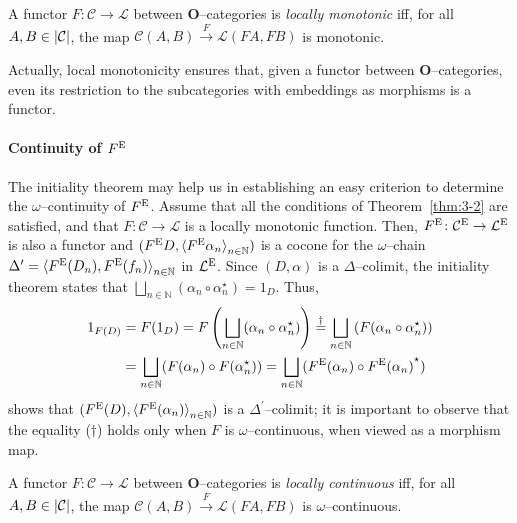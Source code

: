 \begin{dfn}
  A functor \(F \colon \mathcal{C} \to \mathcal{L}\) between \(\mathbf{O}\)--categories is \emph{locally monotonic} iff, for all \(A, B \in \lvert \mathcal{C} \rvert\), the map \(\mathcal{C}(A,B) \overset{F}{\to}\mathcal{L}(FA,FB)\) is monotonic.
\end{dfn}

Actually, local monotonicity ensures that, given a functor between \(\mathbf{O}\)--categories, even its restriction to the subcategories with embeddings as morphisms is a functor.

\paragraph{Continuity of \(F^\textup{E}\)}
The initiality theorem may help us in establishing an easy criterion to determine the \(\omega\)--continuity of \(F^\textup{E}\). %
Assume that all the conditions of Theorem~\ref{thm:3-2} are satisfied, and that \(F \colon \mathcal{C} \to \mathcal{L}\) is a locally monotonic function.
Then, \(F^\textup{E} \colon \mathcal{C}^\textup{E} \to \mathcal{L}^\textup{E}\) is also a functor and \((F^\textup{E}D, {\langle F^\textup{E}\alpha_n\rangle}_{n \in \mathbb{N}})\) is a cocone for the \(\omega\)--chain %
\(\Delta^\prime = {\langle F^\textup{E}(D_n), F^\textup{E}(f_n)\rangle}_{n \in \mathbb{N}}\) in \(\mathcal{L}^\textup{E}\).
Since \((D,\alpha)\) is a \(\Delta\)--colimit, the initiality theorem states that \(\bigsqcup_{n \in \mathbb{N}}(\alpha_n \circ \alpha_n^\star) = 1_D\). %
Thus,
\begin{equation*}
  \begin{split}
    1_{F(D)} &= F(1_D) = F\left(\bigsqcup_{n \in \mathbb{N}}(\alpha_n \circ \alpha_n^\star)\right) \overset{\dagger}{=} \bigsqcup_{n \in \mathbb{N}}\left(F(\alpha_n \circ \alpha_n^\star)\right) \\ &= \bigsqcup_{n \in \mathbb{N}}(F(\alpha_n) \circ F(\alpha_n^\star))
    = \bigsqcup_{n \in \mathbb{N}}(F^\textup{E}(\alpha_n) \circ {F^\textup{E}(\alpha_n)}^\star)
  \end{split}
\end{equation*}
shows that \((F^\textup{E}(D), {\langle F^\textup{E}(\alpha_n)\rangle}_{n \in \mathbb{N}})\) is a \(\Delta^\prime\)--colimit; %
it is important to observe that the equality (\(\dagger{}\)) holds only when \(F\) is \(\omega\)--continuous, when viewed as a morphism map. %

\begin{dfn}
  A functor \(F \colon \mathcal{C} \to \mathcal{L}\) between \(\mathbf{O}\)--categories is \emph{locally continuous} iff, for all \(A, B \in \lvert \mathcal{C} \rvert\), the map \(\mathcal{C}(A,B) \overset{F}{\to}\mathcal{L}(FA,FB)\) is \(\omega{}\)--continuous.
\end{dfn}

